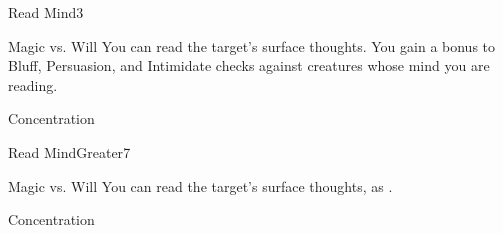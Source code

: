 \begin{spellsection}{Read Mind}{3}
\begin{spellheader}
    \spellrng{\rngmed}
\end{spellheader}
\begin{spellcontent}
    \begin{spelltargetinginfo}
    \end{spelltargetinginfo}
    \begin{spelleffects}
        \begin{spellattack}{Magic vs. Will}
            \spellsuccess You can read the target's surface thoughts. You gain a  bonus to Bluff, Persuasion, and Intimidate checks against creatures whose mind you are reading.
        \end{spellattack}
        \spelldur Concentration
    \end{spelleffects}
\end{spellcontent}
\begin{spellfooter}
\end{spellfooter}
\end{spellsection}

\begin{spellsection}{Read Mind}{Greater}{7}
\begin{spellheader}
    \spellrng{\rngmed}
\end{spellheader}
\begin{spellcontent}
    \begin{spelltargetinginfo}
    \end{spelltargetinginfo}
    \begin{spelleffects}
        \begin{spellattack}{Magic vs. Will}
            \spelleffect You can read the target's surface thoughts, as .
        \end{spellattack}
        \spelldur Concentration
    \end{spelleffects}
\end{spellcontent}
\begin{spellfooter}
\end{spellfooter}
\end{spellsection}

